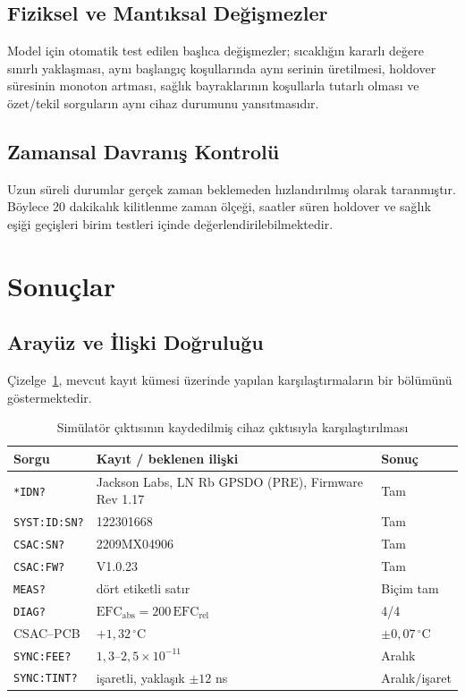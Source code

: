 \documentclass[9pt,twocolumn,a4paper]{extarticle}
\begin{document}
\subsection{Fiziksel ve Mantıksal Değişmezler}
Model için otomatik test edilen başlıca değişmezler; sıcaklığın kararlı değere sınırlı yaklaşması, aynı başlangıç koşullarında aynı serinin üretilmesi, holdover süresinin monoton artması, sağlık bayraklarının koşullarla tutarlı olması ve özet/tekil sorguların aynı cihaz durumunu yansıtmasıdır.

\subsection{Zamansal Davranış Kontrolü}
Uzun süreli durumlar gerçek zaman beklemeden hızlandırılmış olarak taranmıştır. Böylece 20 dakikalık kilitlenme zaman ölçeği, saatler süren holdover ve sağlık eşiği geçişleri birim testleri içinde değerlendirilebilmektedir.

\section{Sonuçlar}
\subsection{Arayüz ve İlişki Doğruluğu}
Çizelge~\ref{tab:compare}, mevcut kayıt kümesi üzerinde yapılan karşılaştırmaların bir bölümünü göstermektedir.

\begin{table}[t]
\caption{Simülatör çıktısının kaydedilmiş cihaz çıktısıyla karşılaştırılması}
\label{tab:compare}
\centering
\fontsize{9}{10.8}\selectfont
\setlength{\tabcolsep}{3pt}
\begin{tabular}{p{}p{}p{}}
\toprule
\textbf{Sorgu} & \textbf{Kayıt / beklenen ilişki} & \textbf{Sonuç} \\
\midrule
\texttt{*IDN?} & Jackson Labs, LN Rb GPSDO (PRE), Firmware Rev 1.17 & Tam \\
\texttt{SYST:ID:SN?} & 122301668 & Tam \\
\texttt{CSAC:SN?} & 2209MX04906 & Tam \\
\texttt{CSAC:FW?} & V1.0.23 & Tam \\
\texttt{MEAS?} & dört etiketli satır & Biçim tam \\
\texttt{DIAG?} & $\mathrm{EFC}_{\mathrm{abs}}=200\,\mathrm{EFC}_{\mathrm{rel}}$ & 4/4 \\
CSAC--PCB & $+1{,}32\,^{\circ}$C & $\pm0{,}07\,^{\circ}$C \\
\texttt{SYNC:FEE?} & $1{,}3$--$2{,}5\times10^{-11}$ & Aralık \\
\texttt{SYNC:TINT?} & işaretli, yaklaşık $\pm12$ ns & Aralık/işaret \\
\bottomrule
\end{tabular}
\end{table}
\end{document}
